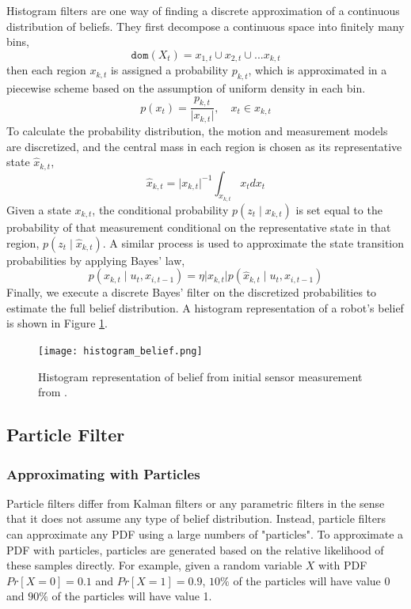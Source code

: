 \documentclass[twoside]{article}
\begin{document}
Histogram filters are one way of finding a discrete approximation of a continuous distribution of beliefs. They first decompose a continuous space into finitely many bins,
\begin{equation}
\mathtt{dom}(X_t) = x_{1,t} \cup x_{2,t} \cup ... x_{k,t}
\end{equation}
then each region $x_{k,t}$ is assigned a probability $p_{k,t}$, which is approximated in a piecewise scheme based on the assumption of uniform density in each bin.
\begin{equation}
p(x_t) = \frac{p_{k,t}}{\lvert x_{k,t} \rvert},\quad x_t \in x_{k,t}
\end{equation}
To calculate the probability distribution, the motion and measurement models are discretized, and the central mass in each region is chosen as its representative state $\hat x_{k,t}$,
\begin{equation}
\hat x_{k,t} = \lvert x_{k,t} \rvert ^{-1}\int_{x_{k,t}}x_t d x_t
\end{equation}
Given a state $x_{k,t}$, the conditional probability $p(z_t \mid x_{k,t})$ is set equal to the probability of that measurement conditional on the representative state in that region, $p(z_t \mid \hat x_{k,t})$. A similar process is used to approximate the state transition probabilities by applying Bayes' law,
\begin{equation}
p(x_{k,t} \mid u_t, x_{i,t-1}) = \eta \lvert x_{k,t} \rvert p(\hat x_{k,t} \mid u_t, \hat x_{i,t-1})
\end{equation}
Finally, we execute a discrete Bayes' filter on the discretized probabilities to estimate the full belief distribution. A histogram representation of a robot's belief is shown in Figure \ref{fig:Histogram_belief}.


\begin{figure}[t]
\centering
\texttt{[image: histogram\_belief.png]}
\caption{Histogram representation of belief from initial sensor measurement from \cite{thrun2005probabilistic}.}
\label{fig:Histogram_belief}
\end{figure}


\subsection{Particle Filter}
\subsubsection{Approximating with Particles}
Particle filters differ from Kalman filters or any parametric filters in the sense that it does not assume any type of belief distribution. Instead, particle filters can approximate any PDF using a large numbers of "particles". To approximate a PDF with particles, particles are generated based on the relative likelihood of these samples directly. For example, given a random variable $X$ with PDF $Pr[X = 0] = 0.1$ and $Pr[X=1] = 0.9$, $10\%$ of the particles will have value 0 and $90\%$ of the particles will have value 1.
\end{document}
